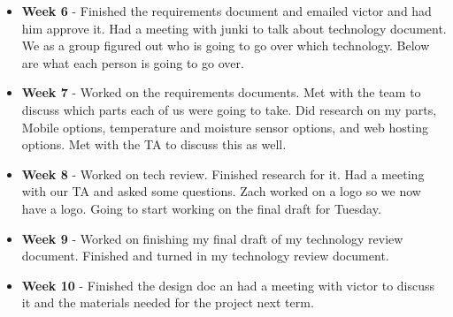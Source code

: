 \documentclass[onecolumn, draftclsnofoot,10pt, compsoc]{IEEEtran}
\begin{document}
\begin{itemize}
					\item \textbf{Week 6} - Finished the requirements document and emailed victor and had him approve it. Had a meeting with junki to talk about technology document. We as a group figured out who is going to go over which technology.  Below are what each person is going to go over.
					\item \textbf{Week 7} - Worked on the requirements documents. Met with the team to discuss which parts each of us were going to take. Did research on my parts, Mobile options, temperature and moisture sensor options, and web hosting options.  Met with the TA to discuss this as well.
					\item \textbf{Week 8} - Worked on tech review. Finished research  for it. Had a meeting with our TA and asked some questions. Zach worked on a logo so we now have a logo.  Going to start working on the final draft for Tuesday.
					\item \textbf{Week 9} - Worked on finishing my final draft of my technology review document. Finished and turned in my technology review document.
					\item \textbf{Week 10} - Finished the design doc an had a meeting with victor to discuss it and the materials needed for the project next term. 
				\end{itemize}
\end{document}
